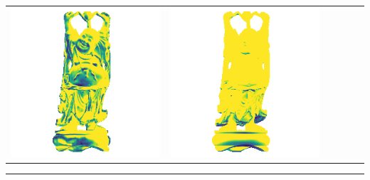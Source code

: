 \begin{center}
\begin{tabularx}{\linewidth}{@{}Y@{}Y@{}Y@{}Y@{}Y@{}Y@{}}
\includegraphics[width=\linewidth]{semisynthetic/20150514_20_marrnet_err.png} &
\includegraphics[width=\linewidth]{semisynthetic/20150514_20_ef_err.png} \\
\end{tabularx}
\begin{center}\rule{0.5\linewidth}{\linethickness}\end{center}


\end{center}
